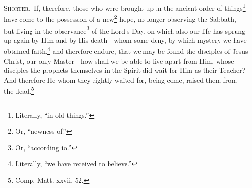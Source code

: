 
\textsc{Shorter.}~If, therefore, those who were brought up in the ancient order of things\footnote{Literally, “in old things.”} have come to the possession of a new\footnote{Or, “newness of.”} hope, no longer observing the Sabbath, but living in the observance\footnote{Or, “according to.”} of the Lord’s Day, on which also our life has sprung up again by Him and by His death—whom some deny, by which mystery we have obtained faith,\footnote{Literally, “we have received to believe.”} and therefore endure, that we may be found the disciples of Jesus Christ, our only Master—how shall we be able to live apart from Him, whose disciples the prophets themselves in the Spirit did wait for Him as their Teacher? And therefore He whom they rightly waited for, being come, raised them from the dead.\footnote{Comp. Matt. xxvii. 52.}

